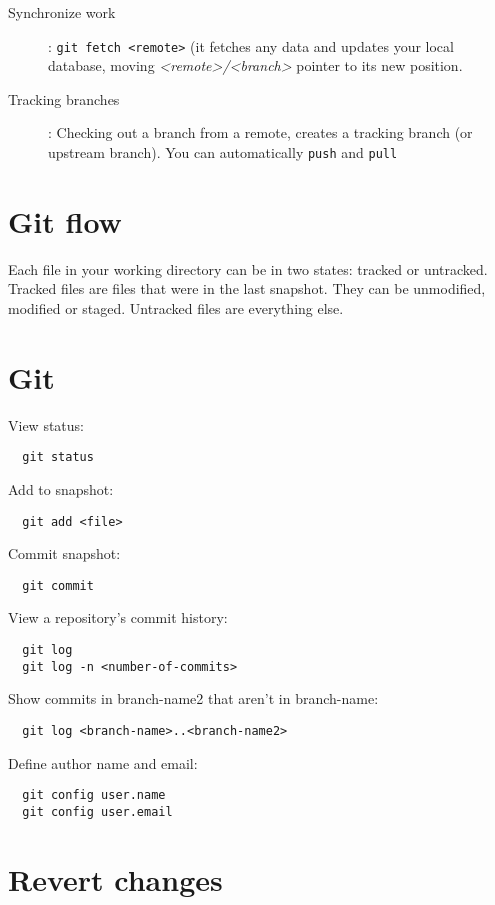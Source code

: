 \documentclass[french]{article}
\begin{document}
\begin{description}
  \item[Synchronize work]: \lstinline{git fetch <remote>} (it fetches any data and updates your local database, moving \emph{<remote>/<branch>} pointer to its new position.
  \item[Tracking branches]: Checking out a branch from a remote, creates a tracking branch (or upstream branch). You can automatically \lstinline{push} and \lstinline{pull}
\end{description}


\section{Git flow}
Each file in your working directory can be in two states: tracked or untracked. Tracked files are files that were in the last snapshot. They can be unmodified, modified or staged. Untracked files are everything else.

\section{Git}


View status:
\begin{verbatim}
  git status
\end{verbatim}

Add to snapshot:
\begin{verbatim}
  git add <file>
\end{verbatim}

Commit snapshot:
\begin{verbatim}
  git commit
\end{verbatim}

View a repository's commit history:
\begin{verbatim}
  git log
  git log -n <number-of-commits>
\end{verbatim}

Show commits in branch-name2 that aren't in branch-name:
\begin{verbatim}
  git log <branch-name>..<branch-name2>
\end{verbatim}

Define author name and email:
\begin{verbatim}
  git config user.name
  git config user.email
\end{verbatim}

\section{Revert changes}
\end{document}
